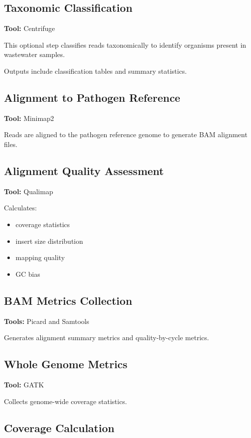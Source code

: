 \documentclass[11pt]{article}
\begin{document}
\subsection{Taxonomic Classification}

\textbf{Tool:} Centrifuge

This optional step classifies reads taxonomically to identify organisms present in wastewater samples.

Outputs include classification tables and summary statistics.

\subsection{Alignment to Pathogen Reference}

\textbf{Tool:} Minimap2

Reads are aligned to the pathogen reference genome to generate BAM alignment files.

\subsection{Alignment Quality Assessment}

\textbf{Tool:} Qualimap

Calculates:

\begin{itemize}
\item coverage statistics
\item insert size distribution
\item mapping quality
\item GC bias
\end{itemize}

\subsection{BAM Metrics Collection}

\textbf{Tools:} Picard and Samtools

Generates alignment summary metrics and quality-by-cycle metrics.

\subsection{Whole Genome Metrics}

\textbf{Tool:} GATK

Collects genome-wide coverage statistics.

\subsection{Coverage Calculation}
\end{document}
